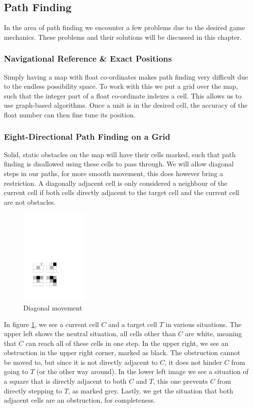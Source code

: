 \subsection{Path Finding}
In the area of path finding we encounter a few problems due to the desired game mechanics. These problems and their solutions will be discussed in this chapter.

\subsubsection{Navigational Reference \& Exact Positions}
Simply having a map with float co-ordinates makes path finding very difficult due to the endless possibility space. To work with this we put a grid over the map, such that the integer part of a float co-ordinate indexes a cell. This allows us to use graph-based algorithms. Once a unit is in the desired cell, the accuracy of the float number can then fine tune its position.

\subsubsection{Eight-Directional Path Finding on a Grid}

Solid, static obstacles on the map will have their cells marked, such that path finding is disallowed using these cells to pass through. We will allow diagonal steps in our paths, for more smooth movement, this does however bring a restriction. A diagonally adjacent cell is only considered a neighbour of the current cell if both cells directly adjacent to the target cell and the current cell are not obstacles.

\begin{figure}
\includegraphics[width=0.30\textwidth]{images/diagonal_moves.pdf}
\caption{Diagonal movement}
\label{fig:diag_move}
\end{figure}

In figure \ref{fig:diag_move}, we see a current cell $C$ and a target cell $T$ in various situations. The upper left shows the neutral situation, all cells other than $C$ are white, meaning that $C$ can reach all of these cells in one step. In the upper right, we see an obstruction in the upper right corner, marked as black. The obstruction cannot be moved to, but since it is not directly adjacent to $C$, it does not hinder $C$ from going to $T$ (or the other way around). In the lower left image we see a situation of a square that is directly adjacent to both $C$ and $T$, this one prevents $C$ from directly stepping to $T$, as marked grey. Lastly, we get the situation that both adjacent cells are an obstruction, for completeness.

